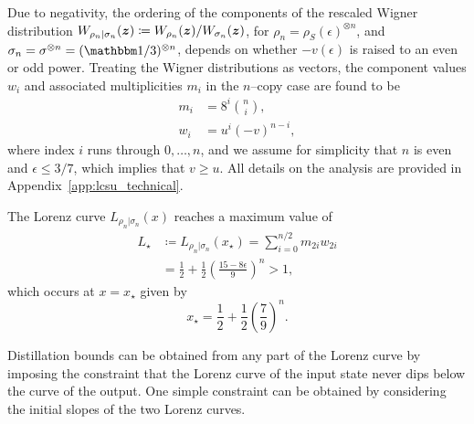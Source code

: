 \documentclass[pra,
aps,
twocolumn,
superscriptaddress,
groupedaddress,
nofootinbib,
reprint
]{revtex4-1}
\begin{document}
Due to negativity, the ordering of the components of the rescaled Wigner distribution $W_{\rho_n |\sigma_n}(\bm{z}) \coloneqq W_{\rho_n}(\bm{z})/W_{\sigma_n}(\bm{z})$, for $\rho_n = \rho_S(\epsilon)^{\otimes n}$, and $\sigma_n = \sigma^{\otimes n}= (\I/3)^{\otimes n}$, depends on whether $-v(\epsilon)$ is raised to an even or odd power. Treating the Wigner distributions as vectors, the component values $w_i$ and associated multiplicities $m_i$ in the $n$--copy case are found to be 
\begin{align}
	m_i &= 8^{i}\binom{n}{i}, \\
	w_i &= u^{i}(-v)^{n-i}, \label{eq:wigu}
\end{align}
where index $i$ runs through $0, \dots, n$, and we assume for simplicity that $n$ is even and $\epsilon \leq 3/7$, which implies that $v \geq u$.
All details on the analysis are provided in Appendix~\ref{app:lcsu_technical}.

The Lorenz curve $L_{\rho_n|\sigma_n}(x)$ reaches a maximum value of
\begin{align}\label{eq:lcsu_max}
	L_\star &\coloneqq L_{\rho_n |\sigma_n} (x_\star) = \sum_{i = 0}^{n/2} m_{2i} w_{2i} \nonumber\\
	&= \frac{1}{2} + \frac{1}{2}\left(\frac{15 - 8\epsilon}{9}\right)^n > 1,
\end{align}
which occurs at $x=x_\star$ given by
\begin{equation}
	x_\star = \frac{1}{2} + \frac{1}{2}\left(\frac{7}{9}\right)^n.
\end{equation}

Distillation bounds can be obtained from any part of the Lorenz curve by imposing the constraint that the Lorenz curve of the input state never dips below the curve of the output. One simple constraint can be obtained by considering the initial slopes of the two Lorenz curves. 
\end{document}
